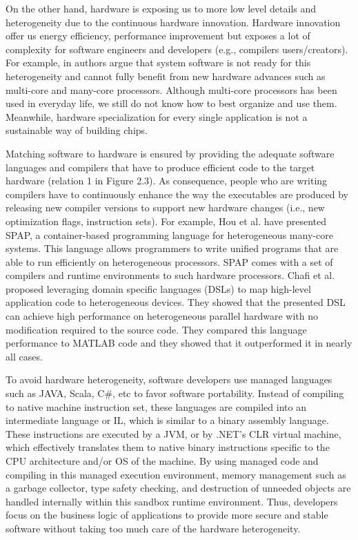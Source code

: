 On the other hand, hardware is exposing us to more low level details and heterogeneity due to the continuous hardware innovation. 
Hardware innovation offer us energy efficiency, performance improvement but exposes a lot of complexity for software engineers and developers (e.g., compilers users/creators).
For example, in \cite{he2010computer} authors argue that system software is not ready for this heterogeneity and cannot fully benefit from new hardware advances such as multi-core and many-core processors. Although multi-core processors has been used in everyday life, we still do not know how to best organize and use them. 
Meanwhile, hardware specialization for every single application is not a sustainable way of building chips.

Matching software to hardware is ensured by providing the adequate software languages and compilers that have to produce efficient code to the target hardware (relation 1 in Figure 2.3). As consequence, people who are writing compilers have to continuously enhance the way the executables are produced by releasing new compiler versions to support new hardware changes (i.e., new optimization flags, instruction sets).
For example, Hou et al.\cite{hou2010spap} have presented SPAP, a container-based programming language for heterogeneous many-core systems. This language allows programmers to write unified programs that are able to run efficiently on heterogeneous processors. SPAP comes with a set of compilers and runtime environments to such hardware processors. Chafi et al.\cite{chafi2010language,chafi2011domain} proposed leveraging domain specific languages (DSLs) to map high-level application code to
heterogeneous devices. They showed that the presented DSL can achieve high performance on heterogeneous parallel hardware with no modification required to the
source code. They compared this language performance to MATLAB code and they showed that it outperformed it in nearly all cases.

To avoid hardware heterogeneity, software developers use managed languages such as JAVA, Scala, C\#, etc to favor software portability. Instead of compiling to native machine instruction set, these languages are compiled into an intermediate language or IL, which is similar to a binary assembly language. These instructions are executed by a JVM, or by .NET's CLR virtual machine, which effectively translates them to native binary instructions specific to the CPU architecture and/or OS of the machine.
By using managed code and compiling in this managed execution environment, memory management such as a garbage collector, type safety checking, and destruction of unneeded objects are handled internally within this sandbox runtime environment. Thus, developers focus on the business logic of applications to provide more secure and stable software without taking too much care of the hardware heterogeneity.

